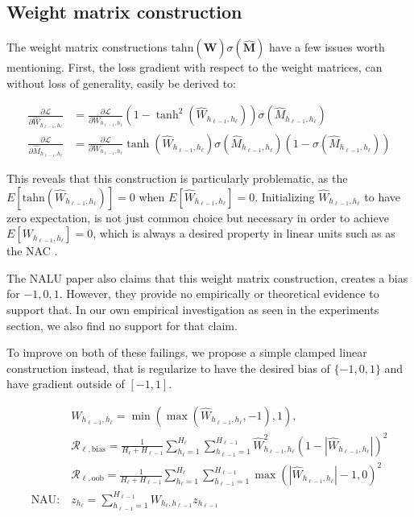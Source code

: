 \subsection{Weight matrix construction}

The weight matrix constructions $\mathrm{tahn}({\hat{\mathbf{W}}}) \sigma({\hat{\mathbf{M}}})$ have a few issues worth mentioning. First, the loss gradient with respect to the weight matrices, can without loss of generality, easily be derived to:

\begin{equation}
\begin{aligned}
\frac{\partial \mathcal{L}}{\partial \hat{W}_{h_{\ell-1},h_\ell}} &= \frac{\partial \mathcal{L}}{\partial W_{h_{\ell-1},h_\ell}} (1 - \tanh^2(\hat{W}_{h_{\ell-1},h_\ell})) \sigma(\hat{M}_{h_{\ell-1},h_\ell}) \\
\frac{\partial \mathcal{L}}{\partial \hat{M}_{h_{\ell-1},h_\ell}} &= \frac{\partial \mathcal{L}}{\partial W_{h_{\ell-1},h_\ell}} \tanh(\hat{W}_{h_{\ell-1},h_\ell}) \sigma(\hat{M}_{h_{\ell-1},h_\ell}) (1 - \sigma(\hat{M}_{h_{\ell-1},h_\ell}))
\end{aligned}
\end{equation}

This reveals that this construction is particularly problematic, as the $E[\mathrm{tahn}(\hat{W}_{h_{\ell-1},h_\ell})] = 0$ when $E[\hat{W}_{h_{\ell-1},h_\ell}] = 0$. Initializing $\hat{W}_{h_{\ell-1},h_\ell}$ to have zero expectation, is not just common choice but necessary in order to achieve $E[W_{h_{\ell-1},h_\ell}] = 0$, which is always a desired property in linear units such as as the NAC \cite{glorot-initialization}.

The NALU \cite{trask-nalu} paper also claims that this weight matrix construction, creates a bias for ${-1, 0, 1}$. However, they provide no empirically or theoretical evidence to support that. In our own empirical investigation as seen in the experiments section, we also find no support for that claim.

To improve on both of these failings, we propose a simple clamped linear construction instead, that is regularize to have the desired bias of $\{-1, 0, 1\}$ and have gradient outside of $[-1, 1]$.

\begin{equation}
\begin{aligned}
&W_{h_{\ell-1},h_\ell} = \min(\max(\hat{W}_{h_{\ell-1},h_\ell}, -1), 1), \\
&\mathcal{R}_{\ell,\mathrm{bias}} = \frac{1}{H_\ell + H_{\ell-1}} \sum_{h_\ell=1}^{H_\ell} \sum_{h_{\ell-1}=1}^{H_{\ell-1}} \hat{W}_{h_{\ell-1},h_\ell}^2 (1 - |\hat{W}_{h_{\ell-1},h_\ell}|)^2 \\
&\mathcal{R}_{\ell,\mathrm{oob}} = \frac{1}{H_\ell + H_{\ell-1}} \sum_{h_\ell=1}^{H_\ell} \sum_{h_{\ell-1}=1}^{H_{\ell-1}} \max(|\hat{W}_{h_{\ell-1},h_\ell}| - 1, 0)^2 \\
\textrm{NAU}:\ &z_{h_\ell} = \sum_{h_{\ell-1}=1}^{H_{\ell-1}} W_{h_{\ell}, h_{\ell-1}} z_{h_{\ell-1}} \\\end{aligned}
\end{equation}

